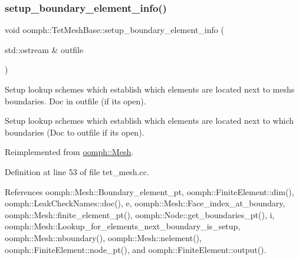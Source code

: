 \subsubsection{\texorpdfstring{setup\+\_\+boundary\+\_\+element\+\_\+info()}{setup\_boundary\_element\_info()}\hspace{0.1cm}{\footnotesize\ttfamily [2/2]}}
{\footnotesize\ttfamily void oomph\+::\+Tet\+Mesh\+Base\+::setup\+\_\+boundary\+\_\+element\+\_\+info (\begin{DoxyParamCaption}\item[{std\+::ostream \&}]{outfile }\end{DoxyParamCaption})\hspace{0.3cm}{\ttfamily [virtual]}}



Setup lookup schemes which establish which elements are located next to mesh\textquotesingle{}s boundaries. Doc in outfile (if it\textquotesingle{}s open). 

Setup lookup schemes which establish which elements are located next to which boundaries (Doc to outfile if it\textquotesingle{}s open). 

Reimplemented from \hyperlink{classoomph_1_1Mesh_a413cbcbea4fb1111703da9ee97429640}{oomph\+::\+Mesh}.



Definition at line 53 of file tet\+\_\+mesh.\+cc.



References oomph\+::\+Mesh\+::\+Boundary\+\_\+element\+\_\+pt, oomph\+::\+Finite\+Element\+::dim(), oomph\+::\+Leak\+Check\+Names\+::doc(), e, oomph\+::\+Mesh\+::\+Face\+\_\+index\+\_\+at\+\_\+boundary, oomph\+::\+Mesh\+::finite\+\_\+element\+\_\+pt(), oomph\+::\+Node\+::get\+\_\+boundaries\+\_\+pt(), i, oomph\+::\+Mesh\+::\+Lookup\+\_\+for\+\_\+elements\+\_\+next\+\_\+boundary\+\_\+is\+\_\+setup, oomph\+::\+Mesh\+::nboundary(), oomph\+::\+Mesh\+::nelement(), oomph\+::\+Finite\+Element\+::node\+\_\+pt(), and oomph\+::\+Finite\+Element\+::output().

\mbox{\label{classoomph_1_1TetMeshBase_a1670b81c0ed5509661c179d9e46bdd1c}} 
